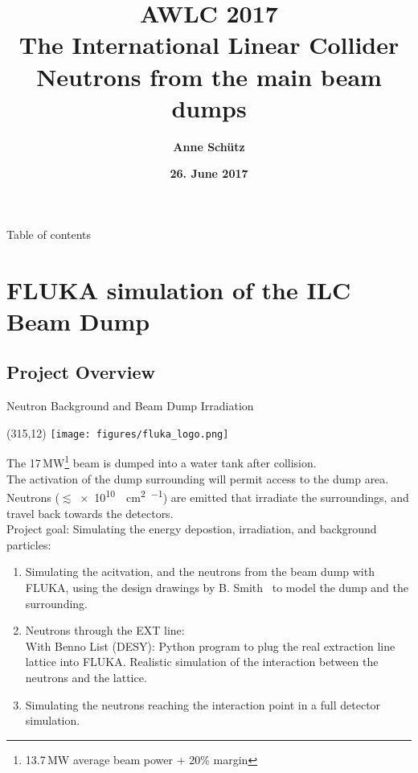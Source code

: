 \documentclass[xcolor={dvipsnames}]{beamer}
\title[Neutrons from the main beam dumps]{\textbf{\alert{AWLC 2017} \\ \vspace*{0.3cm} The International Linear Collider \\ \LARGE Neutrons from the main beam dumps}}
\author{\textbf{Anne Sch\"utz}}
\institute{\textbf{DESY}}
\date{\textbf{26. June 2017}}
\newcommand{\flukalogo}{
  \setlength{\TPHorizModule}{1pt}
  \setlength{\TPVertModule}{1pt}
  \begin{textblock}{1}(315,12)
   \texttt{[image: figures/fluka\_logo.png]}
  \end{textblock}
}
\begin{document}
{
\begin{frame}
  \titlepage
\end{frame}
}

\begin{frame}{Table of contents}
  \tableofcontents
\end{frame}



\section{FLUKA simulation of the ILC Beam Dump}
\subsection{Project Overview}
{
\begin{frame}{Neutron Background and Beam Dump Irradiation}
\flukalogo
The 17\,MW\footnote{13.7\,MW average beam power + 20\% margin} beam is dumped into a water tank after collision.\\The activation of the dump surrounding will permit access to the dump area. Neutrons ($\lesssim$\SI{e10}{\per\square\centi\metre\per\year}) are emitted that irradiate the surroundings, and travel back towards the detectors.~\cite{SLAC_FLUKA}\\
\alert{Project goal: Simulating the energy depostion, irradiation, and background particles:}
\begin{enumerate}
 \item Simulating the acitvation, and the neutrons from the beam dump with FLUKA, using the design drawings by B. Smith~\cite{Smith} to model the dump and the surrounding.
 \item Neutrons through the EXT line:\\
 With Benno List (DESY): Python program to plug the real extraction line lattice into FLUKA. Realistic simulation of the interaction between the neutrons and the lattice.
 \item Simulating the neutrons reaching the interaction point in a full detector simulation.
\end{enumerate}
\end{frame}
}
\end{document}
